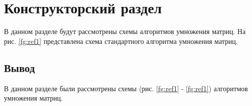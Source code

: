 \chapter{Конструкторский раздел}
\label{cha:design}
В данном разделе будут рассмотрены схемы алгоритмов умножения матриц.
На рис. \ref{fg:ref1} представлена схема стандартного алгоритма умножения матриц.

\begin{figure}[ht!]
\end{figure}



\section{Вывод}

В данном разделе были рассмотрены схемы (рис. \ref{fg:ref1} - \ref{fg:ref1}) алгоритмов умножения матриц.